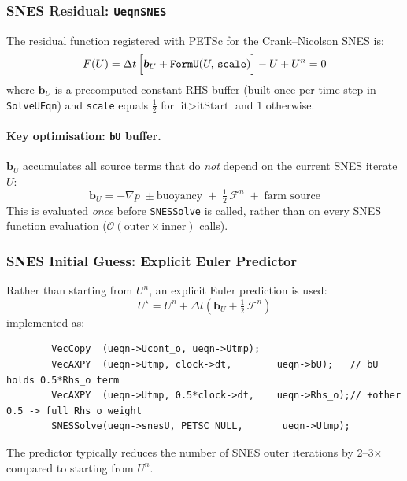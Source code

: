 \documentclass[12pt,a4paper]{article}
\newcommand{\dt}{\Delta t}
\newcommand{\half}{\tfrac{1}{2}}
\begin{document}
	\subsubsection{SNES Residual: \texttt{UeqnSNES}}
	
	The residual function registered with PETSc for the Crank--Nicolson
	SNES is:
	\begin{equation}
		F(U) = \dt\,\Bigl[\bm{b}_U + \texttt{FormU}(U,\,\texttt{scale})\Bigr]
		- U + U^n = 0
		\label{eq:SNESres}
	\end{equation}
	where $\bm{b}_U$ is a precomputed constant-RHS buffer (built once per
	time step in \texttt{SolveUEqn}) and \texttt{scale} equals $\half$ for
	$\text{it} > \text{itStart}$ and $1$ otherwise.
	
	\paragraph{Key optimisation: \texttt{bU} buffer.}
	$\bm{b}_U$ accumulates all source terms that do \emph{not} depend on
	the current SNES iterate $U$:
	\begin{equation}
		\bm{b}_U = -\nabla p
		\;\pm\text{buoyancy}
		\;+\; \half\,\mathcal{F}^n
		\;+\;\text{farm source}
	\end{equation}
	This is evaluated \emph{once} before \texttt{SNESSolve} is called,
	rather than on every SNES function evaluation
	($\mathcal{O}(\text{outer}\times\text{inner})$ calls).
	
	\subsubsection{SNES Initial Guess: Explicit Euler Predictor}
	
	Rather than starting from $U^n$, an explicit Euler prediction is used:
	\begin{equation}
		U^{\star} = U^n + \dt\left(\bm{b}_U + \half\,\mathcal{F}^n\right)
		\label{eq:predictor}
	\end{equation}
	implemented as:
	\begin{lstlisting}
		VecCopy  (ueqn->Ucont_o, ueqn->Utmp);
		VecAXPY  (ueqn->Utmp, clock->dt,        ueqn->bU);   // bU holds 0.5*Rhs_o term
		VecAXPY  (ueqn->Utmp, 0.5*clock->dt,    ueqn->Rhs_o);// +other 0.5 -> full Rhs_o weight
		SNESSolve(ueqn->snesU, PETSC_NULL,       ueqn->Utmp);
	\end{lstlisting}
	The predictor typically reduces the number of SNES outer iterations by
	2--3$\times$ compared to starting from $U^n$.
	
\end{document}
